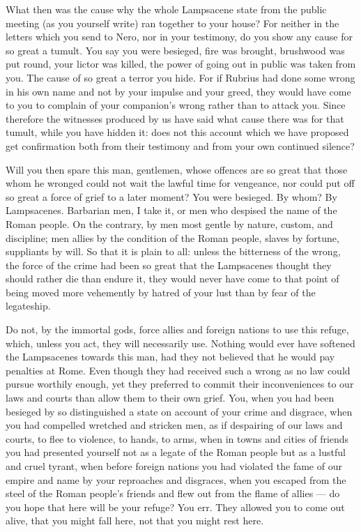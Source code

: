  What then was the cause why the whole Lampsacene state from the public meeting (as you yourself write) ran together to your house? For neither in the letters which you send to Nero, nor in your testimony, do you show any cause for so great a tumult. You say you were besieged, fire was brought, brushwood was put round, your lictor was killed, the power of going out in public was taken from you. The cause of so great a terror you hide. For if Rubrius had done some wrong in his own name and not by your impulse and your greed, they would have come to you to complain of your companion's wrong rather than to attack you. Since therefore the witnesses produced by us have said what cause there was for that tumult, while you have hidden it: does not this account which we have proposed get confirmation both from their testimony and from your own continued silence?

 Will you then spare this man, gentlemen, whose offences are so great that those whom he wronged could not wait the lawful time for vengeance, nor could put off so great a force of grief to a later moment? You were besieged. By whom? By Lampsacenes. Barbarian men, I take it, or men who despised the name of the Roman people. On the contrary, by men most gentle by nature, custom, and discipline; men allies by the condition of the Roman people, slaves by fortune, suppliants by will. So that it is plain to all: unless the bitterness of the wrong, the force of the crime had been so great that the Lampsacenes thought they should rather die than endure it, they would never have come to that point of being moved more vehemently by hatred of your lust than by fear of the legateship.

 Do not, by the immortal gods, force allies and foreign nations to use this refuge, which, unless you act, they will necessarily use. Nothing would ever have softened the Lampsacenes towards this man, had they not believed that he would pay penalties at Rome. Even though they had received such a wrong as no law could pursue worthily enough, yet they preferred to commit their inconveniences to our laws and courts than allow them to their own grief. You, when you had been besieged by so distinguished a state on account of your crime and disgrace, when you had compelled wretched and stricken men, as if despairing of our laws and courts, to flee to violence, to hands, to arms, when in towns and cities of friends you had presented yourself not as a legate of the Roman people but as a lustful and cruel tyrant, when before foreign nations you had violated the fame of our empire and name by your reproaches and disgraces, when you escaped from the steel of the Roman people's friends and flew out from the flame of allies --- do you hope that here will be your refuge? You err. They allowed you to come out alive, that you might fall here, not that you might rest here.

